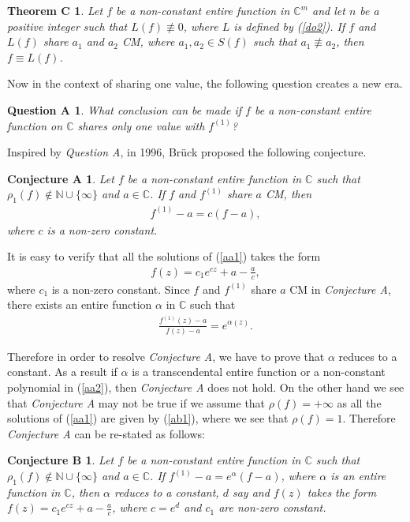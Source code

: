 \documentclass[11pt, reqno]{amsart}
\newtheorem*{theoC}{Theorem C}
\newtheorem*{conjA}{Conjecture A}
\newtheorem*{conjB}{Conjecture B}
\newtheorem*{quesA}{Question A}
\numberwithin{equation}{section}
\begin{document}
\begin{theoC} \cite[Theorem 2.2]{Berenstein-Chang-Li} Let $f$ be a non-constant entire function in $\mathbb{C}^m$ and let $n$ be a positive integer such that $L(f)\not\equiv 0$, where $L$ is defined by (\ref{do2}). If $f$ and $L(f)$ share $a_1$ and $a_2$ CM, where $a_1, a_2\in S(f)$ such that $a_1\not\equiv a_2$, then $f\equiv L(f)$. 
\end{theoC}


Now in the context of sharing one value, the following question creates a new era.
\begin{quesA} What conclusion can be made if $f$ be a non-constant entire function on $\mathbb{C}$ shares only one value with $f^{(1)}$?\end{quesA}

Inspired by \emph{Question A}, in 1996, Br\"{u}ck \cite{Bruck-1996} proposed the following conjecture.
\begin{conjA}\cite{Bruck-1996} Let $f$ be a non-constant entire function in $\mathbb{C}$ such that $\rho_1(f)\not\in\mathbb{N}\cup\{\infty\}$ and $a\in\mathbb{C}$. If $f$ and $f^{(1)}$ share $a$ CM, then 
\begin{align}\label{aa1}
f^{(1)}-a=c(f-a),
\end{align}
where $c$ is a non-zero constant.
\end{conjA}

It is easy to verify that all the solutions of (\ref{aa1}) takes the form
\begin{align}\label{ab1}
f(z)=c_1e^{cz}+a-\frac{a}{c},
\end{align}
where $c_1$ is a non-zero constant. Since $f$ and $f^{(1)}$ share $a$ CM in \emph{Conjecture A}, there exists an entire function $\alpha$ in $\mathbb{C}$ such that
\begin{align}\label{aa2}
\frac{f^{(1)}(z)-a}{f(z)-a}=e^{\alpha(z)}.
\end{align}

Therefore in order to resolve \emph{Conjecture A}, we have to prove that $\alpha$ reduces to a constant. As a result if $\alpha$ is a transcendental entire function or a non-constant polynomial in (\ref{aa2}), then \emph{Conjecture A} does not hold. On the other hand we see that \emph{Conjecture A} may not be true if we assume that $\rho(f)=+\infty$ as all the solutions of (\ref{aa1}) are given by (\ref{ab1}), where we see that $\rho(f)=1$. Therefore \emph{Conjecture A} can be re-stated as follows:

\begin{conjB} Let $f$ be a non-constant entire function in $\mathbb{C}$ such that $\rho_1(f)\not\in\mathbb{N}\cup\{\infty\}$ and $a\in\mathbb{C}$. If $f^{(1)}-a=e^{\alpha}(f-a)$, where $\alpha$ is an entire function in $\mathbb{C}$, then $\alpha$ reduces to a constant, $d$ say and $f(z)$ takes the form $f(z)=c_1e^{cz}+a-\frac{a}{c}$, where $c=e^d$ and $c_1$ are non-zero constant.
\end{conjB}
\end{document}
